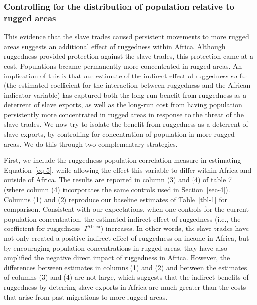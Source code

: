 \documentclass[
  letterpaper,
  DIV=11,
  numbers=noendperiod]{scrartcl}
\begin{document}
\subsubsection{Controlling for the distribution of population relative
to rugged
areas}\label{controlling-for-the-distribution-of-population-relative-to-rugged-areas}

This evidence that the slave trades caused persistent movements to more
rugged areas suggests an additional effect of ruggedness within Africa.
Although ruggedness provided protection against the slave trades, this
protection came at a cost. Populations became permanently more
concentrated in rugged areas. An implication of this is that our
estimate of the indirect effect of ruggedness so far (the estimated
coefficient for the interaction between ruggedness and the African
indicator variable) has captured both the long-run benefit from
ruggedness as a deterrent of slave exports, as well as the long-run cost
from having population persistently more concentrated in rugged areas in
response to the threat of the slave trades. We now try to isolate the
benefit from ruggedness as a deterrent of slave exports, by controlling
for concentration of population in more rugged areas. We do this through
two complementary strategies.

First, we include the ruggedness-population correlation measure in
estimating Equation~\ref{eq-5}, while allowing the effect this variable
to differ within Africa and outside of Africa. The results are reported
in column (3) and (4) of table 7 (where column (4) incorporates the same
controls used in Section~\ref{sec-4}). Columns (1) and (2) reproduce our
baseline estimates of Table~\ref{tbl-1} for comparison. Consistent with
our expectations, when one controls for the current population
concentration, the estimated indirect effect of ruggedness (i.e., the
coefficient for \(\text{ruggedness}\cdot I^\text{Africa}\)) increases.
In other words, the slave trades have not only created a positive
indirect effect of ruggedness on income in Africa, but by encouraging
population concentrations in rugged areas, they have also amplified the
negative direct impact of ruggedness in Africa. However, the differences
between estimates in columns (1) and (2) and between the estimates of
columns (3) and (4) are not large, which suggests that the indirect
benefits of ruggedness by deterring slave exports in Africa are much
greater than the costs that arise from past migrations to more rugged
areas.
\end{document}
